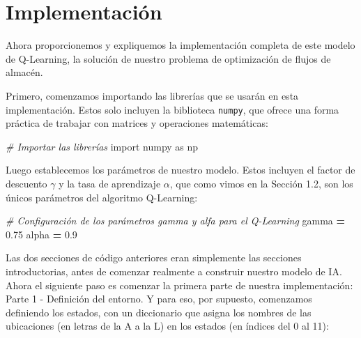 \documentclass[
]{book}
\newenvironment{Shaded}{\begin{snugshade}}{\end{snugshade}}
\newcommand{\CommentTok}[1]{\textcolor[rgb]{0.56,0.35,0.01}{\textit{#1}}}
\newcommand{\FloatTok}[1]{\textcolor[rgb]{0.00,0.00,0.81}{#1}}
\newcommand{\ImportTok}[1]{#1}
\newcommand{\NormalTok}[1]{#1}
\newcommand{\OperatorTok}[1]{\textcolor[rgb]{0.81,0.36,0.00}{\textbf{#1}}}
\begin{document}
\hypertarget{implementaciuxf3n}{%
\section{Implementación}\label{implementaciuxf3n}}

Ahora proporcionemos y expliquemos la implementación completa de este modelo de Q-Learning, la solución de nuestro problema de optimización de flujos de almacén.

Primero, comenzamos importando las librerías que se usarán en esta implementación. Estos solo incluyen la biblioteca \texttt{numpy}, que ofrece una forma práctica de trabajar con matrices y operaciones matemáticas:

\begin{Shaded}
\begin{Highlighting}[]
\CommentTok{\# Importar las librerías}
\ImportTok{import}\NormalTok{ numpy }\ImportTok{as}\NormalTok{ np}
\end{Highlighting}
\end{Shaded}

Luego establecemos los parámetros de nuestro modelo. Estos incluyen el factor de descuento \(\gamma\) y la tasa de aprendizaje \(\alpha\), que como vimos en la Sección 1.2, son los únicos parámetros del algoritmo Q-Learning:

\begin{Shaded}
\begin{Highlighting}[]
\CommentTok{\# Configuración de los parámetros gamma y alfa para el Q{-}Learning}
\NormalTok{gamma }\OperatorTok{=} \FloatTok{0.75}
\NormalTok{alpha }\OperatorTok{=} \FloatTok{0.9}
\end{Highlighting}
\end{Shaded}

Las dos secciones de código anteriores eran simplemente las secciones introductorias, antes de comenzar realmente a construir nuestro modelo de IA. Ahora el siguiente paso es comenzar la primera parte de nuestra implementación: Parte 1 - Definición del entorno. Y para eso, por supuesto, comenzamos definiendo los estados, con un diccionario que asigna los nombres de las ubicaciones (en letras de la A a la L) en los estados (en índices del 0 al 11):
\end{document}
